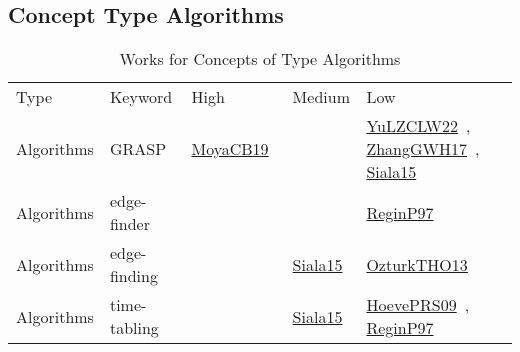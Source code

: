 \clearpage
\subsection{Concept Type Algorithms}
\label{sec:Algorithms}
{\scriptsize
\begin{longtable}{lp{3cm}>{\raggedright\arraybackslash}p{6cm}>{\raggedright\arraybackslash}p{6cm}>{\raggedright\arraybackslash}p{8cm}}
\rowcolor{white}\caption{Works for Concepts of Type Algorithms}\\ \toprule
\rowcolor{white}Type & Keyword & High & Medium & Low\\ \midrule\endhead
\bottomrule
\endfoot
Algorithms & GRASP & \href{../cars/works/MoyaCB19.pdf}{MoyaCB19}~\cite{MoyaCB19} &  & \href{../cars/works/YuLZCLW22.pdf}{YuLZCLW22}~\cite{YuLZCLW22}, \href{../cars/works/ZhangGWH17.pdf}{ZhangGWH17}~\cite{ZhangGWH17}, \href{../cars/works/Siala15.pdf}{Siala15}~\cite{Siala15}\\
Algorithms & edge-finder &  &  & \href{../cars/works/ReginP97.pdf}{ReginP97}~\cite{ReginP97}\\
Algorithms & edge-finding &  & \href{../cars/works/Siala15.pdf}{Siala15}~\cite{Siala15} & \href{../cars/works/OzturkTHO13.pdf}{OzturkTHO13}~\cite{OzturkTHO13}\\
Algorithms & time-tabling &  & \href{../cars/works/Siala15.pdf}{Siala15}~\cite{Siala15} & \href{../cars/works/HoevePRS09.pdf}{HoevePRS09}~\cite{HoevePRS09}, \href{../cars/works/ReginP97.pdf}{ReginP97}~\cite{ReginP97}\\
\end{longtable}
}

